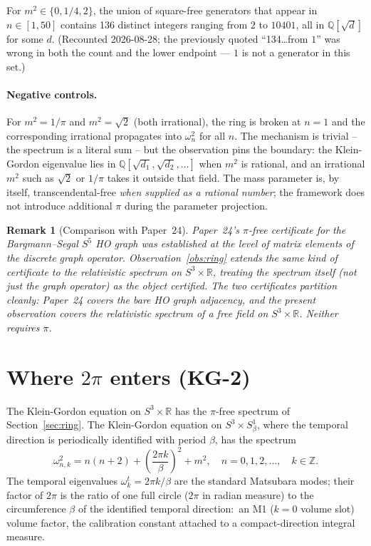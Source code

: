 \documentclass[11pt]{article}
\newtheorem{remark}{Remark}
\begin{document}
For $m^2 \in \{0, 1/4, 2\}$, the union of square-free generators that
appear in $n \in [1, 50]$ contains 136 distinct integers ranging from
$2$ to $10401$, all in $\mathbb{Q}[\sqrt{d}]$ for some $d$.
(Recounted 2026-08-28; the previously quoted ``134\ldots from $1$''
was wrong in both the count and the lower endpoint --- $1$ is not a
generator in this set.)

\paragraph{Negative controls.}  For $m^2 = 1/\pi$ and $m^2 = \sqrt{2}$
(both irrational), the ring is broken at $n = 1$ and the corresponding
irrational propagates into $\omega_n^2$ for all $n$.  The mechanism is
trivial -- the spectrum is a literal sum -- but the observation pins the
boundary: the Klein-Gordon eigenvalue lies in
$\mathbb{Q}[\sqrt{d_1}, \sqrt{d_2}, \ldots]$ when $m^2$ is rational,
and an irrational $m^2$ such as $\sqrt{2}$ or $1/\pi$ takes it outside
that field.  The mass parameter is, by itself, transcendental-free
\emph{when supplied as a rational number}; the framework does not
introduce additional $\pi$ during the parameter projection.

\begin{remark}[Comparison with Paper~24]
\label{rem:ring_compare}
Paper~24's $\pi$-free certificate for the Bargmann--Segal $S^5$ HO
graph was established at the level of matrix elements of the
discrete graph operator.  Observation~\ref{obs:ring} extends the same
kind of certificate to the relativistic spectrum on $S^3 \times
\mathbb{R}$, treating the spectrum itself (not just the graph operator)
as the object certified.  The two certificates partition cleanly:
Paper~24 covers the bare HO graph adjacency, and the present
observation covers the relativistic spectrum of a free field on
$S^3 \times \mathbb{R}$.  Neither requires $\pi$.
\end{remark}

\section{Where $2\pi$ enters (KG-2)}
\label{sec:where_pi}

The Klein-Gordon equation on $S^3 \times \mathbb{R}$ has the
$\pi$-free spectrum of Section~\ref{sec:ring}.  The Klein-Gordon
equation on $S^3 \times S^1_\beta$, where the temporal direction is
periodically identified with period $\beta$, has the spectrum
\begin{equation}
\label{eq:kg_compactified}
\omega_{n,k}^2 = n(n+2) + \left(\frac{2\pi k}{\beta}\right)^2 + m^2,
\quad n = 0, 1, 2, \ldots, \quad k \in \mathbb{Z}.
\end{equation}
The temporal eigenvalues $\omega^t_k = 2\pi k / \beta$ are the standard
Matsubara modes; their factor of $2\pi$ is the ratio of one full circle
($2\pi$ in radian measure) to the circumference $\beta$ of the
identified temporal direction:\ an M1 ($k = 0$ volume slot)
volume factor, the calibration constant attached to a
compact-direction integral measure.
\end{document}
